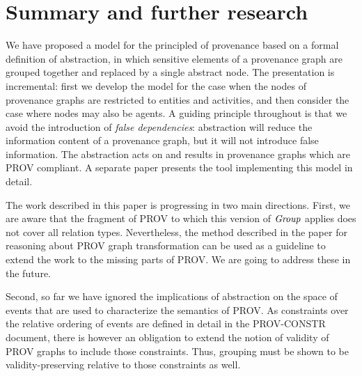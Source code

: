 
\section{Summary and further research}
\label{sec:further}

We have proposed a model for the principled  of provenance based on a formal definition of abstraction, in which sensitive elements of a provenance graph are grouped together and replaced by a single abstract node.  The presentation is incremental: first we develop the model for the case when the nodes of provenance graphs are restricted to entities and activities, and then consider the case where nodes may also be agents.  A guiding principle  throughout is that we avoid the introduction of \emph{false dependencies}: abstraction will reduce the information content of a provenance graph, but it will not introduce false information.  
The abstraction acts on and results in provenance graphs which are PROV compliant.   A separate paper presents the tool implementing this model in detail.


The work described in this paper is progressing in two main directions.
%
First, we are aware that the fragment of PROV to which this version of $\mathit{Group}$ applies does not cover all relation types. Nevertheless, the method described in the paper for reasoning about PROV graph transformation can be used as a guideline to extend the work to the missing parts of PROV. We are going to address these in the future.

Second, so far we have ignored the implications of abstraction on the space of events that are used to characterize the semantics of PROV. As constraints over the relative ordering of events are defined in detail in the PROV-CONSTR document, there is however an obligation to extend the notion of validity of PROV graphs to include those constraints. Thus, grouping must be shown to be validity-preserving relative to those constraints as well. 



